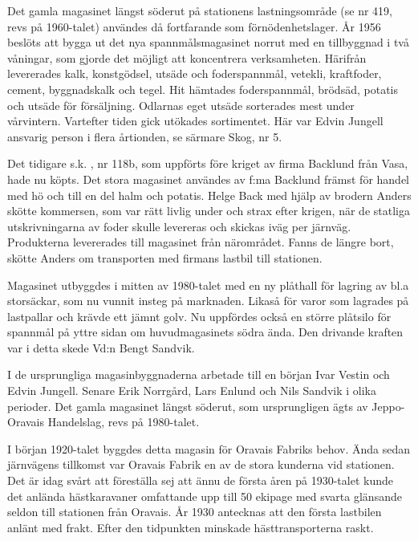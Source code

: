 Det gamla magasinet längst söderut på stationens lastningsområde (se nr 419, revs på 1960-talet) användes då fortfarande som förnödenhetslager. År 1956 beslöts att bygga ut det nya spannmålsmagasinet norrut med en tillbyggnad i två våningar, som gjorde det möjligt att koncentrera verksamheten. Härifrån levererades kalk, konstgödsel, utsäde och foderspannmål, vetekli, kraftfoder, cement, byggnadskalk och tegel. Hit hämtades foderspannmål, brödsäd, potatis och utsäde för försäljning. Odlarnas eget utsäde sorterades mest under vårvintern. Vartefter tiden gick utökades sortimentet. Här var Edvin Jungell ansvarig person i flera årtionden, se särmare Skog, nr 5.


Det tidigare s.k. , nr 118b, som uppförts före kriget av firma Backlund från Vasa, hade nu köpts. Det stora magasinet användes av f:ma Backlund främst för handel med hö och till en del halm och potatis. Helge Back med hjälp av brodern Anders skötte kommersen, som var rätt livlig under och strax efter krigen, när de statliga utskrivningarna av foder skulle levereras och skickas iväg per järnväg. Produkterna levererades till magasinet från närområdet. Fanns de längre bort, skötte Anders om transporten med firmans lastbil till stationen.

Magasinet utbyggdes i mitten av 1980-talet med en ny plåthall för lagring av bl.a storsäckar, som nu vunnit insteg på marknaden. Likaså för varor som lagrades på lastpallar och krävde ett jämnt golv. Nu uppfördes också en större plåtsilo för spannmål på yttre sidan om huvudmagasinets södra ända. Den drivande kraften var i detta skede Vd:n Bengt Sandvik.

I de ursprungliga magasinbyggnaderna arbetade till en början Ivar Vestin och Edvin Jungell. Senare Erik Norrgård, Lars Enlund och Nils Sandvik i olika perioder. Det gamla magasinet längst söderut, som ursprungligen ägts av Jeppo-Oravais Handelslag, revs på 1980-talet.






I  början 1920-talet byggdes detta magasin för Oravais Fabriks behov. Ända sedan järnvägens tillkomst var Oravais Fabrik en av de stora kunderna vid stationen. Det är idag svårt att föreställa sej att ännu de första åren på 1930-talet kunde det anlända hästkaravaner omfattande upp till 50 ekipage med svarta glänsande seldon till stationen från Oravais. År 1930 antecknas att den första lastbilen anlänt med frakt. Efter den tidpunkten minskade hästtransporterna raskt.

